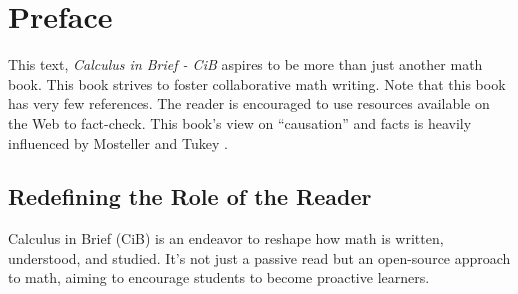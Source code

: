 \documentclass[a4paper,12pt]{book}
\begin{document}
\begin{titlepage}
\end{titlepage}

\tableofcontents
\cleardoublepage

\chapter*{Preface}
This text, \emph{Calculus in Brief - CiB} aspires to be more than just another math book. This book strives to foster collaborative math writing. Note that this book has very few references. The reader is encouraged to use resources available on the Web to fact-check. This book's view on ``causation'' and facts is heavily influenced by Mosteller and Tukey \cite{mosteller1977}.

\section*{Redefining the Role of the Reader}
Calculus in Brief (CiB) is an endeavor to reshape how math is written, understood, and studied. It's not just a passive read but an open-source approach to math, aiming to encourage students to become proactive learners.
\end{document}
